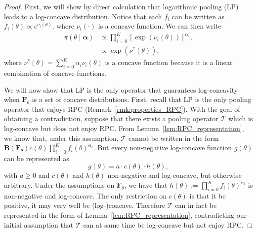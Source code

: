 \documentclass[a4paper, notitlepage, 11pt]{article}
\begin{document}
\begin{proof}
First, we will show by direct calculation that logarithmic pooling (LP) leads to a log-concave distribution.
Notice that each $f_i$ can be written as $ f_i(\theta) \propto e^{\nu_i(\theta)}$, where $\nu_i(\cdot)$ is a concave function.
We can then write
\begin{align*}
 \pi(\theta \mid \boldsymbol \alpha) &\propto \prod_{i=0}^{K} [\exp(\nu_i(\theta))]^{\alpha_i},\\
             &\propto \exp(\nu^{\ast}(\theta)),
\end{align*}
 where $\nu^{\ast}(\theta) = \sum_{i=0}^{K}\alpha_i\nu_i(\theta)$ is a concave function because it is a linear combination of concave functions.
 
We will now show that LP is the only operator that guarantees log-concavity when $\boldsymbol F_\theta$ is a set of concave distributions.
First, recall that LP is the only pooling operator that enjoys RPC (Remark~\ref{rmk:properties_RPC}).
With the goal of obtaining a contradiction, suppose that there exists a pooling operator $\mathcal{T}$ which is log-concave but does not enjoy RPC.
From Lemma~\ref{lem:RPC_representation}, we know that, under this assumption, $\mathcal{T}$ cannot be written in the form $\boldsymbol B(\boldsymbol F_\theta) c(\theta) \prod_{i=0}^K f_i(\theta)^{\alpha_i} $.
But every non-negative log-concave function $g(\theta)$ can be represented as
 \begin{equation}
 \label{eq:lc_rep}
  g(\theta) = a \cdot c(\theta) \cdot h(\theta),
 \end{equation}
with $a \geq 0$ and $c(\theta)$ and $h(\theta)$ non-negative and log-concave, but otherwise arbitrary.
Under the assumptions on $\boldsymbol F_\theta$, we have that $h(\theta) := \prod_{i=0}^K f_i(\theta)^{\alpha_i}$ is non-negative and log-concave.
The only restriction on $c(\theta)$ is that it be positive, it may very well be (log-)concave.
Therefore $\mathcal{T}$ can in fact be represented in the form of Lemma~\ref{lem:RPC_representation}, contradicting our initial assumption that $\mathcal{T}$ can at same time be log-concave but not enjoy RPC.  
\end{proof}
\end{document}
